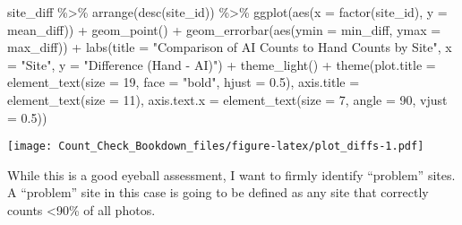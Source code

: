 \documentclass[
]{book}
\newenvironment{Shaded}{\begin{snugshade}}{\end{snugshade}}
\newcommand{\AttributeTok}[1]{\textcolor[rgb]{0.77,0.63,0.00}{#1}}
\newcommand{\DecValTok}[1]{\textcolor[rgb]{0.00,0.00,0.81}{#1}}
\newcommand{\FloatTok}[1]{\textcolor[rgb]{0.00,0.00,0.81}{#1}}
\newcommand{\FunctionTok}[1]{\textcolor[rgb]{0.00,0.00,0.00}{#1}}
\newcommand{\NormalTok}[1]{#1}
\newcommand{\SpecialCharTok}[1]{\textcolor[rgb]{0.00,0.00,0.00}{#1}}
\newcommand{\StringTok}[1]{\textcolor[rgb]{0.31,0.60,0.02}{#1}}
\begin{document}
\begin{Shaded}
\begin{Highlighting}[]
\NormalTok{site\_diff }\SpecialCharTok{\%\textgreater{}\%}
  \FunctionTok{arrange}\NormalTok{(}\FunctionTok{desc}\NormalTok{(site\_id)) }\SpecialCharTok{\%\textgreater{}\%}
  \FunctionTok{ggplot}\NormalTok{(}\FunctionTok{aes}\NormalTok{(}\AttributeTok{x =} \FunctionTok{factor}\NormalTok{(site\_id), }\AttributeTok{y =}\NormalTok{ mean\_diff)) }\SpecialCharTok{+}
  \FunctionTok{geom\_point}\NormalTok{() }\SpecialCharTok{+}
  \FunctionTok{geom\_errorbar}\NormalTok{(}\FunctionTok{aes}\NormalTok{(}\AttributeTok{ymin =}\NormalTok{ min\_diff, }\AttributeTok{ymax =}\NormalTok{ max\_diff)) }\SpecialCharTok{+}
  \FunctionTok{labs}\NormalTok{(}\AttributeTok{title =} \StringTok{"Comparison of AI Counts to Hand Counts by Site"}\NormalTok{, }\AttributeTok{x =} \StringTok{"Site"}\NormalTok{, }\AttributeTok{y =} \StringTok{"Difference (Hand {-} AI)"}\NormalTok{) }\SpecialCharTok{+}
  \FunctionTok{theme\_light}\NormalTok{() }\SpecialCharTok{+}
  \FunctionTok{theme}\NormalTok{(}\AttributeTok{plot.title =} \FunctionTok{element\_text}\NormalTok{(}\AttributeTok{size =} \DecValTok{19}\NormalTok{, }\AttributeTok{face =} \StringTok{"bold"}\NormalTok{, }\AttributeTok{hjust =} \FloatTok{0.5}\NormalTok{),}
        \AttributeTok{axis.title =} \FunctionTok{element\_text}\NormalTok{(}\AttributeTok{size =} \DecValTok{11}\NormalTok{),}
        \AttributeTok{axis.text.x =} \FunctionTok{element\_text}\NormalTok{(}\AttributeTok{size =} \DecValTok{7}\NormalTok{, }\AttributeTok{angle =} \DecValTok{90}\NormalTok{, }\AttributeTok{vjust =} \FloatTok{0.5}\NormalTok{))}
\end{Highlighting}
\end{Shaded}

\texttt{[image: Count\_Check\_Bookdown\_files/figure-latex/plot\_diffs-1.pdf]}

While this is a good eyeball assessment, I want to firmly identify ``problem'' sites. A ``problem'' site in this case is going to be defined as any site that correctly counts \textless90\% of all photos.
\end{document}
